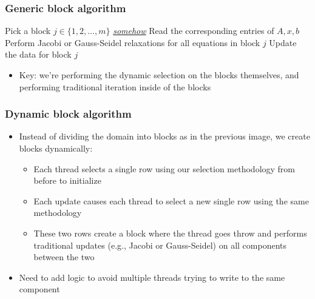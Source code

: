 \documentclass{beamer}
\begin{document}
\begin{frame}
	\frametitle{Generic block algorithm}
	\begin{algorithm}[H]
		\DontPrintSemicolon
		 {
			 {
				Pick a block $j \in \{1, 2, \ldots, m\}$ {\em{\underline{somehow}}} \; 
				Read the corresponding entries of $A, x, b$ \;
				Perform Jacobi or Gauss-Seidel relaxations for all equations in block $j$ \;
				Update the data for block $j$ \;
			}
		}
	\end{algorithm}
	\begin{itemize}
	    \item Key: we're performing the dynamic selection on the blocks themselves, and performing traditional iteration inside of the blocks
	\end{itemize}
\end{frame}

\begin{frame}
	\frametitle{Dynamic block algorithm}
	\begin{itemize}
	    \item Instead of dividing the domain into blocks as in the previous image, we create blocks dynamically:
	        \begin{itemize}
	            \item Each thread selects a single row using our selection methodology from before to initialize
	            \item Each update causes each thread to select a new single row using the same methodology
	            \item These two rows create a block where the thread goes throw and performs traditional updates (e.g., Jacobi or Gauss-Seidel) on all components between the two
	        \end{itemize}
        \item Need to add logic to avoid multiple threads trying to write to the same component
	\end{itemize}
\end{frame}
\end{document}
